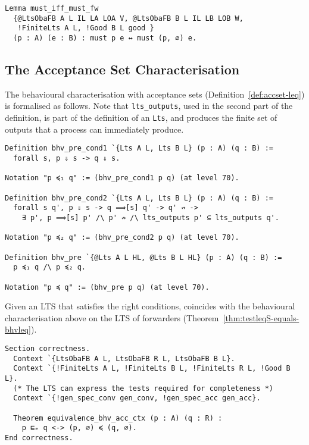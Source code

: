 \begin{mdframed}
\begin{verbatim}
Lemma must_iff_must_fw
  {@LtsObaFB A L IL LA LOA V, @LtsObaFB B L IL LB LOB W,
   !FiniteLts A L, !Good B L good }
  (p : A) (e : B) : must p e ↔ must (p, ∅) e.
\end{verbatim}
\end{mdframed}

\subsection{The Acceptance Set Characterisation}

The behavioural characterisation with acceptance sets
(Definition~\ref{def:accset-leq}) is formalised as follows.
%
Note that \texttt{lts_outputs}, used in the second part of the definition, is
part of the definition of an \texttt{Lts}, and produces the finite set of
outputs that a process can immediately produce.

\begin{mdframed}
\begin{verbatim}
Definition bhv_pre_cond1 `{Lts A L, Lts B L} (p : A) (q : B) :=
  forall s, p ⇓ s -> q ⇓ s.

Notation "p ≼₁ q" := (bhv_pre_cond1 p q) (at level 70).

Definition bhv_pre_cond2 `{Lts A L, Lts B L} (p : A) (q : B) :=
  forall s q', p ⇓ s -> q ⟹[s] q' -> q' ↛ ->
    ∃ p', p ⟹[s] p' /\ p' ↛ /\ lts_outputs p' ⊆ lts_outputs q'.

Notation "p ≼₂ q" := (bhv_pre_cond2 p q) (at level 70).

Definition bhv_pre `{@Lts A L HL, @Lts B L HL} (p : A) (q : B) :=
  p ≼₁ q /\ p ≼₂ q.

Notation "p ≼ q" := (bhv_pre p q) (at level 70).
\end{verbatim}
\end{mdframed}

Given an LTS that satisfies the right conditions, \mustequivalence coincides
with the behavioural characterisation above on the LTS of forwarders
(Theorem~\ref{thm:testleqS-equals-bhvleq}).

\begin{mdframed}
\begin{verbatim}
Section correctness.
  Context `{LtsObaFB A L, LtsObaFB R L, LtsObaFB B L}.
  Context `{!FiniteLts A L, !FiniteLts B L, !FiniteLts R L, !Good B L}.
  (* The LTS can express the tests required for completeness *)
  Context `{!gen_spec_conv gen_conv, !gen_spec_acc gen_acc}.

  Theorem equivalence_bhv_acc_ctx (p : A) (q : R) :
    p ⊑ₑ q <-> (p, ∅) ≼ (q, ∅).
End correctness.
\end{verbatim}
\end{mdframed}


